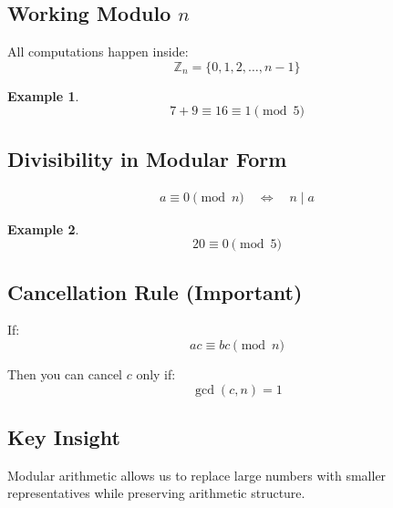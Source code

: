 \documentclass{article}
\newtheorem{example}{Example}
\begin{document}
\subsection*{Working Modulo $n$}

All computations happen inside:
\[
\mathbb{Z}_n = \{0, 1, 2, \dots, n-1\}
\]

\begin{example}
\[
7 + 9 \equiv 16 \equiv 1 \pmod{5}
\]
\end{example}

\subsection*{Divisibility in Modular Form}

\begin{align*}
    a \equiv 0 \pmod{n}
    \quad \iff \quad
    n \mid a
\end{align*}

\begin{example}
\[
20 \equiv 0 \pmod{5}
\]
\end{example}

\subsection*{Cancellation Rule (Important)}

If:
\[
ac \equiv bc \pmod{n}
\]

Then you can cancel $c$ only if:
\[
\gcd(c, n) = 1
\]

\subsection*{Key Insight}

Modular arithmetic allows us to replace large numbers with smaller representatives while preserving arithmetic structure.
\end{document}
